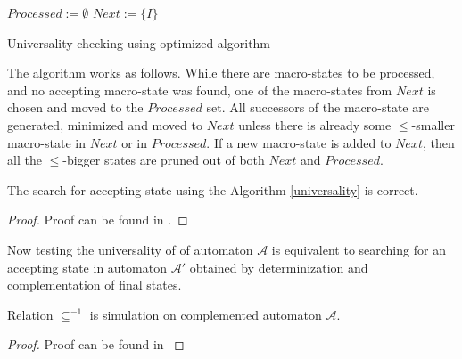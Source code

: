 \begin{algorithm}[hb!]
		\BlankLine
		$Processed := \emptyset$\;
		$Next := \{I\}$\;
		\caption{Universality checking using optimized algorithm \cite{tacas}}\label{universality}
	\end{algorithm}
	
The algorithm works as follows. While there are macro-states to be processed,
and no accepting macro-state was found, one of the macro-states from $Next$ is
chosen and moved to the $Processed$ set. All successors of the macro-state are
generated, minimized and moved to $Next$ unless there is already some
$\leq$-smaller macro-state in $Next$ or in $Processed$. If a
new macro-state is added to $Next$, then all the
$\leq$-bigger states are pruned out of both $Next$ and
$Processed$.
	
\begin{lemma}\label{search-is-correct}
 The search for accepting state using the Algorithm \ref{universality} is
 correct.
\end{lemma}
\begin{proof}
 Proof can be found in \cite{raskin}.
\end{proof}

Now testing the universality of of automaton $\mathcal{A}$ is equivalent to
searching for an accepting state in automaton $\mathcal{A}'$ obtained by
determinization and complementation of final states.

\begin{lemma}\label{simulation-in-ca}
Relation $\subseteq^{-1}$ is simulation on complemented automaton $\mathcal{A}$.
\end{lemma}
\begin{proof}
 Proof can be found in \cite{raskin}
\end{proof}

